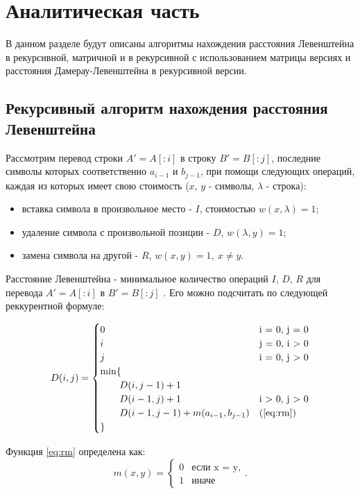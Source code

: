 \chapter{Аналитическая часть}

В данном разделе будут описаны алгоритмы нахождения расстояния Левенштейна в рекурсивной, матричной и в рекурсивной с использованием матрицы версиях и расстояния Дамерау-Левенштейна в рекурсивной версии.

\section{Рекурсивный алгоритм нахождения расстояния Левенштейна}

Рассмотрим перевод строки $A'= A[:i]$ в строку $B' = B[:j]$, последние символы которых соответственно $a_{i-1}$ и $b_{j-1}$, при помощи следующих операций, каждая из которых имеет свою стоимость ($x$, $y$ - символы, $\lambda$ - строка):

\begin{itemize}
	\item вставка символа в произвольное место - $I$, стоимостью $w(x,\lambda)=1$;
	\item удаление символа с произвольной позиции - $D$, $w(\lambda,y)=1$;
	\item замена символа на другой - $R$, $w(x,y)=1, \medspace x \neq y$.
\end{itemize}

Расстояние Левенштейна - минимальное количество операций $I$, $D$, $R$ для перевода $A'= A[:i]$ в $B' = B[:j]$ \cite{foxford}. Его можно подсчитать по следующей реккурентной формуле:

\begin{equation}
	\label{eq:rL}
	D(i, j) = \begin{cases}
		0 &\text{i = 0, j = 0}\\
		i &\text{j = 0, i > 0}\\
		j &\text{i = 0, j > 0}\\
		\min \lbrace \\
		\qquad D(i, j-1) + 1\\
		\qquad D(i-1, j) + 1 &\text{i > 0, j > 0}\\
		\qquad D(i-1, j-1) + m(a_{i-1}, b_{j-1}) &\text(\ref{eq:rm})\\
		\rbrace
	\end{cases}
\end{equation}

Функция \ref{eq:rm} определена как:
\begin{equation}
	\label{eq:rm}
	m(x, y) = \begin{cases}
		0 &\text{если x = y,}\\
		1 &\text{иначе}
	\end{cases}.
\end{equation}

